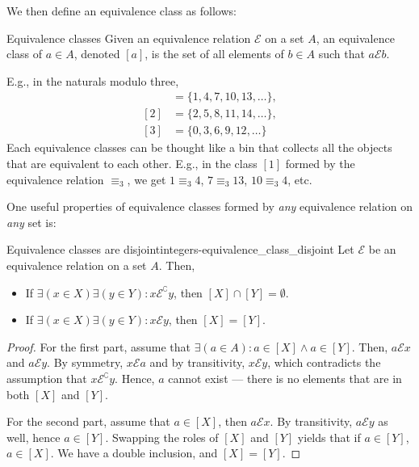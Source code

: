 We then define an equivalence class as follows:
\begin{df}{Equivalence classes}{}
  Given an equivalence relation \(\mathcal{E}\) on a set \(A\), an equivalence class of \(a \in A\),
  denoted \([a]\), is the set of all elements of \(b \in A\) such that
  \(a \mathrel{\mathcal{E}} b\).
\end{df}

E.g., in the naturals modulo three,
\begin{align}
  [1] & = \{1, 4, 7, 10, 13, \dots\}, \\
  [2] & = \{2, 5, 8, 11, 14, \dots\}, \\
  [3] & = \{0, 3, 6, 9, 12, \dots\}
\end{align}
Each equivalence classes can be thought like a bin that collects all the objects that are equivalent
to each other. E.g., in the class \([1]\) formed by the equivalence relation \(\equiv_3\), we get
\(1 \equiv_3 4\), \(7 \equiv_3 13\), \(10 \equiv_3 4\), etc.

One useful properties of equivalence classes formed by \emph{any} equivalence relation on \emph{any}
set is:
\begin{prop}{Equivalence classes are disjoint}{integers-equivalence_class_disjoint}
  Let \(\mathcal{E}\) be an equivalence relation on a set \(A\). Then,
  \begin{itemize}[noitemsep]
    \item If \(\exists(x \in X) \exists(y \in Y) : x \mathrel{\mathcal{E}^{\complement}} y\), then
          \([X] \cap [Y] = \emptyset\).
    \item If \(\exists(x \in X) \exists(y \in Y) : x \mathrel{\mathcal{E}} y\), then \([X] = [Y]\).
  \end{itemize}
\end{prop}

\begin{proof}
  For the first part, assume that \(\exists (a \in A) : a \in [X] \land a \in [Y]\). Then,
  \(a \mathrel{\mathcal{E}} x\) and \(a \mathrel{\mathcal{E}} y\). By symmetry,
  \(x \mathrel{\mathcal{E}} a\) and by transitivity, \(x \mathrel{\mathcal{E}} y\), which
  contradicts the assumption that \(x \mathrel{\mathcal{E}^{\complement}} y\). Hence, \(a\) cannot
  exist --- there is no elements that are in both \([X]\) and \([Y]\).

  For the second part, assume that \(a \in [X]\), then \(a \mathrel{\mathcal{E}} x\). By
  transitivity, \(a \mathrel{\mathcal{E}} y\) as well, hence \(a \in [Y]\). Swapping the roles of
  \([X]\) and \([Y]\) yields that if \(a \in [Y]\), \(a \in [X]\). We have a double inclusion, and
  \([X] = [Y]\).
\end{proof}

